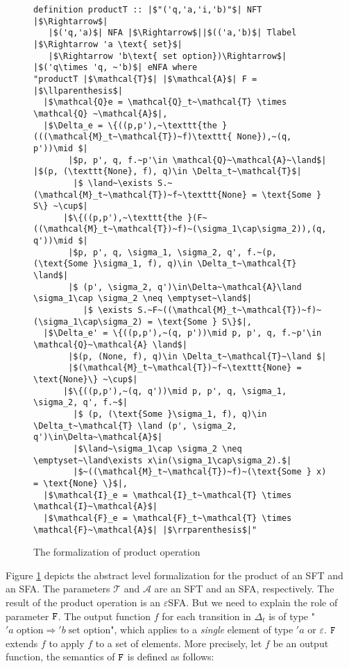 \begin{figure}[hbt!]
	\begin{lstlisting}
definition productT :: |$"('q,'a,'i,'b)"$| NFT |$\Rightarrow$| 
   |$('q,'a)$| NFA |$\Rightarrow$||$(('a,'b)$| Tlabel |$\Rightarrow 'a \text{ set}$| 
   |$\Rightarrow 'b\text{ set option})\Rightarrow$| |$('q\times 'q, ~'b)$| eNFA where
"productT |$\mathcal{T}$| |$\mathcal{A}$| F = |$\llparenthesis$|
  |$\mathcal{Q}e = \mathcal{Q}_t~\mathcal{T} \times \mathcal{Q} ~\mathcal{A}$|,
  |$\Delta_e = \{((p,p'),~\texttt{the }(((\mathcal{M}_t~\mathcal{T})~f)\texttt{ None}),~(q, p'))\mid $|
       |$p, p', q, f.~p'\in \mathcal{Q}~\mathcal{A}~\land$| |$(p, (\texttt{None}, f), q)\in \Delta_t~\mathcal{T}$|
        |$ \land~\exists S.~(\mathcal{M}_t~\mathcal{T})~f~\texttt{None} = \text{Some } S\} ~\cup$|
      |$\{((p,p'),~\texttt{the }(F~((\mathcal{M}_t~\mathcal{T})~f)~(\sigma_1\cap\sigma_2)),(q, q'))\mid $|
       |$p, p', q, \sigma_1, \sigma_2, q', f.~(p, (\text{Some }\sigma_1, f), q)\in \Delta_t~\mathcal{T} \land$|
       |$ (p', \sigma_2, q')\in\Delta~\mathcal{A}\land \sigma_1\cap \sigma_2 \neq \emptyset~\land$|
          |$ \exists S.~F~((\mathcal{M}_t~\mathcal{T})~f)~(\sigma_1\cap\sigma_2) = \text{Some } S\}$|,
  |$\Delta_e' = \{((p,p'),~(q, p'))\mid p, p', q, f.~p'\in \mathcal{Q}~\mathcal{A} \land$|
       |$(p, (None, f), q)\in \Delta_t~\mathcal{T}~\land $|
       |$(\mathcal{M}_t~\mathcal{T})~f~\texttt{None} = \text{None}\} ~\cup$|
      |$\{((p,p'),~(q, q'))\mid p, p', q, \sigma_1, \sigma_2, q', f.~$|
        |$ (p, (\text{Some }\sigma_1, f), q)\in \Delta_t~\mathcal{T} \land (p', \sigma_2, q')\in\Delta~\mathcal{A}$|
        |$\land~\sigma_1\cap \sigma_2 \neq \emptyset~\land\exists x\in(\sigma_1\cap\sigma_2).$|
        |$~((\mathcal{M}_t~\mathcal{T})~f)~(\text{Some } x) = \text{None} \}$|,
  |$\mathcal{I}_e = \mathcal{I}_t~\mathcal{T} \times \mathcal{I}~\mathcal{A}$|
  |$\mathcal{F}_e = \mathcal{F}_t~\mathcal{T} \times \mathcal{F}~\mathcal{A}$| |$\rrparenthesis$|"
	\end{lstlisting}
\caption{The formalization of product operation}
\label{fig-def-FTProd}
\end{figure}

Figure \ref{fig-def-FTProd} depicts the abstract level formalization for the product of an SFT and an SFA. The parameters $\mathcal{T}$ and $\mathcal{A}$ are an SFT and an SFA, respectively. The 
result of the product operation is an $\varepsilon$SFA.
But we need to explain the role of parameter $\text{\texttt{F}}$. The output function $f$ for each transition in $\Delta_t$ is of type "$'a\;\text{option} \Rightarrow 'b\;\text{set option}$", which applies to a \emph{single} element of type $'a$ or $\varepsilon$. $\text{\texttt{F}}$ extends $f$ to apply $f$ to a set of elements. More precisely, let $f$ be an output function, the semantics of $\text{\texttt{F}}$ is defined as follows:

